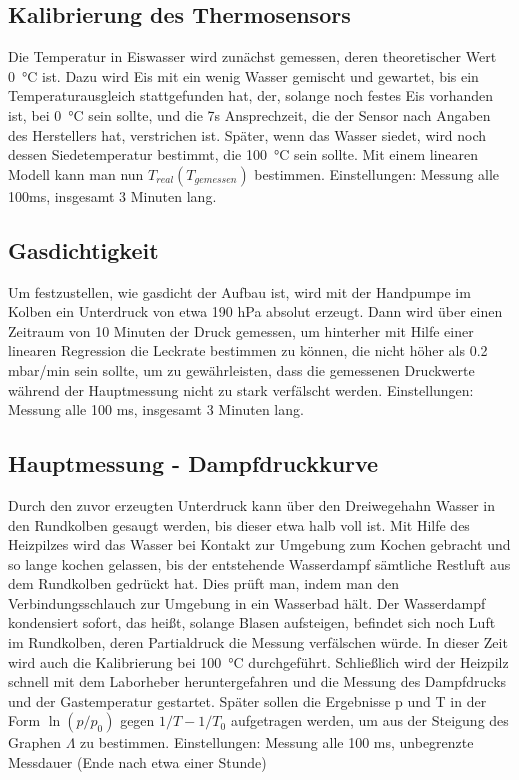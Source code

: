 \documentclass[]{article}
\begin{document}
	\subsection {Kalibrierung des Thermosensors}  
	Die Temperatur in Eiswasser wird zunächst gemessen, deren theoretischer Wert \SI{0}{\celsius} ist. Dazu wird Eis mit ein wenig Wasser gemischt und gewartet, bis ein Temperaturausgleich stattgefunden hat, der, solange noch festes Eis vorhanden ist, bei \SI{0}{\celsius} sein sollte, und die 7s Ansprechzeit, die der Sensor nach Angaben des Herstellers hat, verstrichen ist. Später, wenn das Wasser siedet, wird noch dessen Siedetemperatur bestimmt, die \SI{100}{\celsius} sein sollte. Mit einem linearen Modell kann man nun $T_{real}(T_{gemessen})$ bestimmen.
	Einstellungen: Messung alle 100ms, insgesamt 3 Minuten lang.
	
	\subsection{Gasdichtigkeit}
	Um festzustellen, wie gasdicht der Aufbau ist, wird mit der Handpumpe im Kolben ein Unterdruck von etwa 190 hPa absolut erzeugt. Dann wird über einen Zeitraum von 10 Minuten der Druck gemessen, um hinterher mit Hilfe einer linearen Regression die Leckrate bestimmen zu können, die nicht höher als 0.2 mbar/min sein sollte, um zu gewährleisten, dass die gemessenen Druckwerte während der Hauptmessung nicht zu stark verfälscht werden. 
	Einstellungen: Messung alle 100 ms, insgesamt 3 Minuten lang.
	
	
	\subsection{Hauptmessung - Dampfdruckkurve}
	Durch den zuvor erzeugten Unterdruck kann über den Dreiwegehahn Wasser in den Rundkolben gesaugt werden, bis dieser etwa halb voll ist. Mit Hilfe des Heizpilzes wird das Wasser bei Kontakt zur Umgebung zum Kochen gebracht und so lange kochen gelassen, bis der entstehende Wasserdampf sämtliche Restluft aus dem Rundkolben gedrückt hat. Dies prüft man, indem man den Verbindungsschlauch zur Umgebung in ein Wasserbad hält. Der Wasserdampf kondensiert sofort, das heißt, solange Blasen aufsteigen, befindet sich noch Luft im Rundkolben, deren Partialdruck die Messung verfälschen würde. In dieser Zeit wird auch die Kalibrierung bei \SI{100}{\celsius} durchgeführt. Schließlich wird der Heizpilz schnell mit dem Laborheber heruntergefahren und die Messung des Dampfdrucks und der Gastemperatur gestartet. Später sollen die Ergebnisse p und T in der Form $\ln(p/p_0)$ gegen $1/T-1/T_0$ aufgetragen werden, um aus der Steigung des Graphen $\Lambda$ zu bestimmen.
	Einstellungen: Messung alle 100 ms, unbegrenzte Messdauer (Ende nach etwa einer Stunde)\\
	
\end{document}

